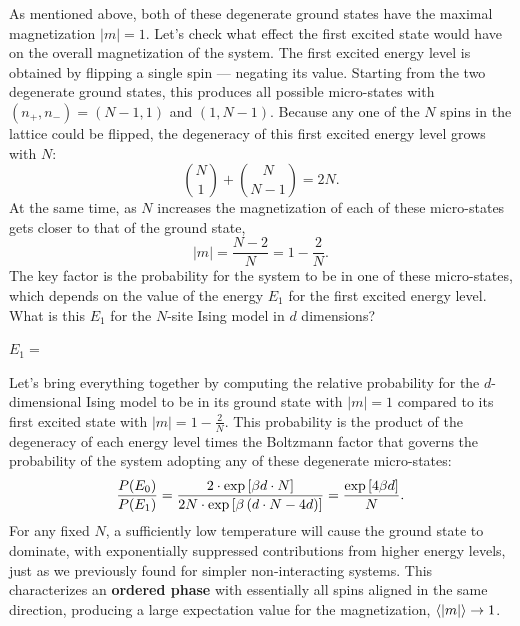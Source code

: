 As mentioned above, both of these degenerate ground states have the maximal magnetization $|m| = 1$.
Let's check what effect the first excited state would have on the overall magnetization of the system.
The first excited energy level is obtained by flipping a single spin --- negating its value. %
Starting from the two degenerate ground states, this produces all possible micro-states with $(n_+, n_-) = (N - 1, 1)$ and $(1, N - 1)$.
Because any one of the $N$ spins in the lattice could be flipped, the degeneracy of this first excited energy level grows with $N$:
\begin{equation*}
  \binom{N}{1} + \binom{N}{N - 1} = 2N.
\end{equation*}
At the same time, as $N$ increases the magnetization of each of these micro-states gets closer to that of the ground state,
\begin{equation*}
  |m| = \frac{N - 2}{N} = 1 - \frac{2}{N}.
\end{equation*}
\newpage %
\noindent The key factor is the probability for the system to be in one of these micro-states, which depends on the value of the energy $E_1$ for the first excited energy level.
What is this $E_1$ for the $N$-site Ising model in $d$ dimensions?
\begin{mdframed}
  $\displaystyle E_1 = $ \\[100 pt]
\end{mdframed}

Let's bring everything together by computing the relative probability for the $d$-dimensional Ising model to be in its ground state with $|m| = 1$ compared to its first excited state with $|m| = 1 - \frac{2}{N}$.
This probability is the product of the degeneracy of each energy level times the Boltzmann factor that governs the probability of the system adopting any of these degenerate micro-states:
\begin{equation*}
  \frac{P(E_0)}{P(E_1)} = \frac{2\cdot \exp\left[\beta d\cdot N\right]}{2N\cdot \exp\left[\beta \left(d\cdot N - 4d\right)\right]} = \frac{\exp\left[4\beta d\right]}{N}.
\end{equation*}
For any fixed $N$, a sufficiently low temperature will cause the ground state to dominate, with exponentially suppressed contributions from higher energy levels, just as we previously found for simpler non-interacting systems.
This characterizes an \textbf{ordered phase} with essentially all spins aligned in the same direction, producing a large expectation value for the magnetization, $\left\langle |m| \right\rangle \to 1$.

